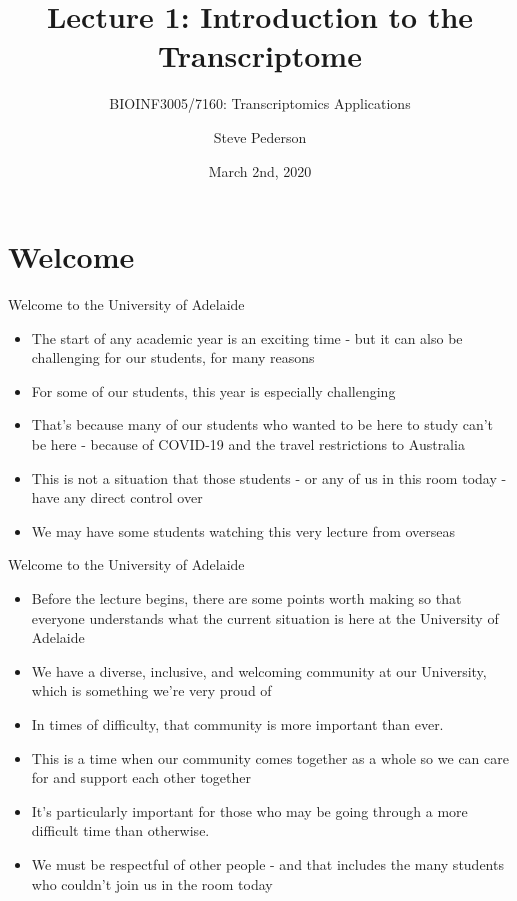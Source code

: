 \documentclass[11pt]{beamer}
\author{Steve Pederson}
\title{Lecture 1: Introduction to the Transcriptome}
\subtitle{BIOINF3005/7160: Transcriptomics Applications}
\institute{University of Adelaide}
\date{March 2nd, 2020}
\begin{document}
\begin{frame}
\titlepage
\end{frame}

\begin{frame}
\tableofcontents
\end{frame}

\section{Welcome}


\begin{frame}{Welcome to the University of Adelaide}

	\begin{itemize}
		\item The start of any academic year is an exciting time - but it can also be challenging for our students, for many reasons
		\item For some of our students, this year is especially challenging
		\item That’s because many of our students who wanted to be here to study can’t be here - because of COVID-19 and the travel restrictions to Australia
		\item This is not a situation that those students - or any of us in this room today - have any direct control over
		\item We may have some students watching this very lecture from overseas
	\end{itemize}
	
\end{frame}

\begin{frame}{Welcome to the University of Adelaide}

	\begin{itemize}
		\item Before the lecture begins, there are some points worth making so that everyone understands what the current situation is here at the University of Adelaide
		\item We have a diverse, inclusive, and welcoming community at our University, which is something we’re very proud of
		\item In times of difficulty, that community is more important than ever.
		\item This is a time when our community comes together as a whole so we can care for and support each other together
		\item It’s particularly important for those who may be going through a more difficult time than otherwise. 
		\item We must be respectful of other people - and that includes the many students who couldn’t join us in the room today
	\end{itemize}

\end{frame}
\end{document}
